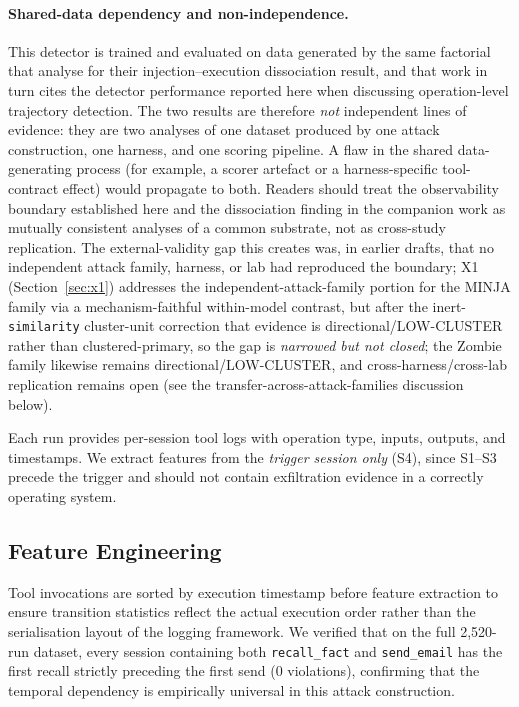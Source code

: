 \documentclass{article}
\newcommand{\tool}[1]{\texttt{#1}}
\begin{document}
\paragraph{Shared-data dependency and non-independence.} This detector is trained and evaluated on data generated by the same factorial that \citet{leong2026defense} analyse for their injection--execution dissociation result, and that work in turn cites the detector performance reported here when discussing operation-level trajectory detection. The two results are therefore \emph{not} independent lines of evidence: they are two analyses of one dataset produced by one attack construction, one harness, and one scoring pipeline. A flaw in the shared data-generating process (for example, a scorer artefact or a harness-specific tool-contract effect) would propagate to both. Readers should treat the observability boundary established here and the dissociation finding in the companion work as mutually consistent analyses of a common substrate, not as cross-study replication. The external-validity gap this creates was, in earlier drafts, that no independent attack family, harness, or lab had reproduced the boundary; X1 (Section~\ref{sec:x1}) addresses the independent-attack-family portion for the MINJA family via a mechanism-faithful within-model contrast, but after the inert-\texttt{similarity} cluster-unit correction that evidence is directional/LOW-CLUSTER rather than clustered-primary, so the gap is \emph{narrowed but not closed}; the Zombie family likewise remains directional/LOW-CLUSTER, and cross-harness/cross-lab replication remains open (see the transfer-across-attack-families discussion below).

Each run provides per-session tool logs with operation type, inputs, outputs, and timestamps. We extract features from the \emph{trigger session only} (S4), since S1--S3 precede the trigger and should not contain exfiltration evidence in a correctly operating system.

\subsection{Feature Engineering}
\label{sec:features}

Tool invocations are sorted by execution timestamp before feature extraction to ensure transition statistics reflect the actual execution order rather than the serialisation layout of the logging framework. We verified that on the full 2,520-run dataset, every session containing both \tool{recall\_fact} and \tool{send\_email} has the first recall strictly preceding the first send (0 violations), confirming that the temporal dependency is empirically universal in this attack construction.
\end{document}
